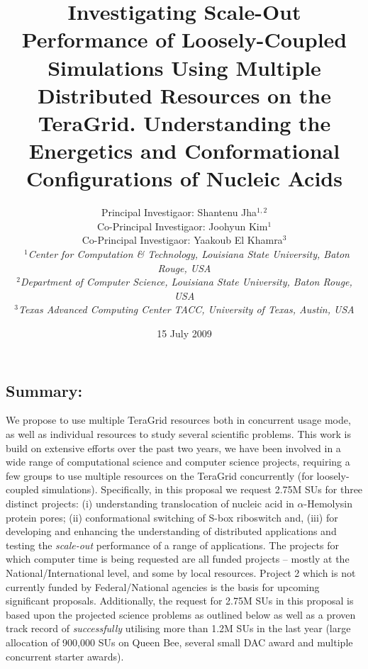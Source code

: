 \documentclass[a4paper,10pt]{article}
\begin{document}
\title{\large Investigating Scale-Out Performance of 
Loosely-Coupled Simulations Using Multiple Distributed Resources on the TeraGrid. Understanding the Energetics and Conformational Configurations of Nucleic Acids}

\author{Principal Investigaor: Shantenu Jha$^{1,2}$ \\ Co-Principal Investigaor: Joohyun Kim$^{1}$ \\ Co-Principal Investigaor: Yaakoub El Khamra$^{3}$\\\
   \small{\emph{$^{1}$Center for Computation \& Technology, Louisiana State University, Baton Rouge, 
USA}}
\\
  \small{\emph{$^{2}$Department of Computer Science, Louisiana State
      University, Baton Rouge, USA}}
\\
  \small{\emph{$^{3}$Texas Advanced Computing Center TACC, University of Texas, Austin, USA}}}

\newif\ifdraft
\drafttrue
\ifdraft
\newcommand{\amnote}[1]{ {\textcolor{magenta} { ***AM: #1c }}}
\newcommand{\jhanote}[1]{ {\textcolor{red} { ***SJ: #1 }}}
\newcommand{\michaelnote}[1]{ {\textcolor{blue} { ***MM: #1 }}}
\else
\newcommand{\amnote}[1]{}
\newcommand{\jhanote}[1]{}
\newcommand{\michaelnote}[1]{ {\textcolor{blue} { ***MM: #1 }}}
\fi


\date{15 July 2009}

\maketitle

\subsection*{Summary:} 

We propose to use multiple TeraGrid resources both in concurrent usage mode, as well as individual resources to study several scientific problems.  This work is build on extensive efforts over the past two years, we have been involved in a wide range of computational science and computer science projects, requiring a few groups to use multiple resources on the TeraGrid concurrently (for loosely-coupled simulations).  Specifically, in this proposal we request 2.75M SUs for three distinct projects: (i) understanding translocation of nucleic acid in $\alpha$-Hemolysin protein pores; (ii) conformational switching of S-box riboswitch and, (iii) for developing and enhancing the understanding of distributed applications and testing the {\it scale-out } performance of a range of applications. The projects for which computer time is being requested are all funded projects -- mostly at the National/International level, and some by local resources. Project 2 which is not currently funded by Federal/National agencies is the basis for upcoming significant proposals.  Additionally, the request for 2.75M SUs in this proposal is based upon the projected science problems as outlined below as well as a proven track record of {\it successfully} utilising more than 1.2M SUs in the last year (large allocation of 900,000 SUs on Queen Bee, several small DAC award and multiple concurrent starter awards).
\end{document}
